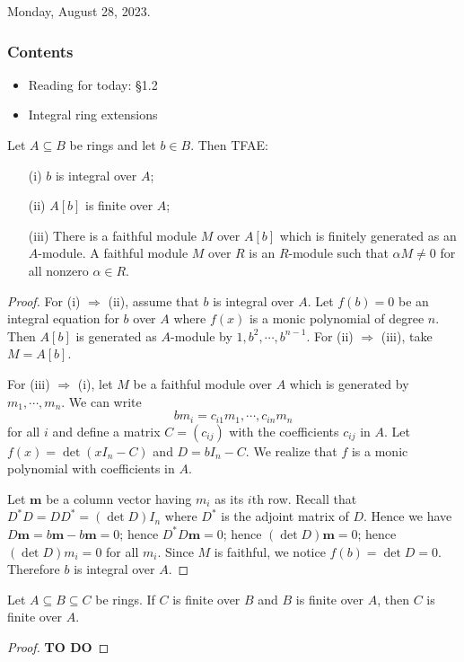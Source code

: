 Monday, August 28, 2023.
\subsubsection*{Contents}
\begin{itemize}
    \item Reading for today: \S 1.2
    \item Integral ring extensions
\end{itemize}

\begin{proposition}
    \label{lecture3_1}
    Let $A\subseteq B$ be rings and let $b \in B$. Then TFAE:
    \begin{enumerate}
        \item[(i)] $b$ is integral over $A$;
        \item[(ii)] $A[b]$ is finite over $A$;
        \item[(iii)] There is a faithful module $M$ over $A[b]$ which is finitely generated as an $A$-module. A faithful module $M$ over $R$ is an $R$-module such that $\alpha M \neq 0$ for all nonzero $\alpha \in R$.
    \end{enumerate}
\end{proposition}
\begin{proof}
    For (i) $\Rightarrow$ (ii), assume that $b$ is integral over $A$. Let $f(b) = 0$ be an integral equation for $b$ over $A$ where $f(x)$ is a monic polynomial of degree $n$. Then $A[b]$ is generated as $A$-module by $1, b^2, \cdots, b^{n-1}$. For (ii) $\Rightarrow$ (iii), take $M = A[b]$.

    For (iii) $\Rightarrow$ (i), let $M$ be a faithful module over $A$ which is generated by $m_1, \cdots, m_n$. We can write 
    \[bm_i = c_{i1}m_1, \cdots, c_{in}m_n\]
    for all $i$ and define a matrix $C = (c_{ij})$ with the coefficients $c_{ij}$ in $A$. Let $f(x) = \det(xI_n - C)$ and $D = bI_n - C$. We realize that $f$ is a monic polynomial with coefficients in $A$.
    
    Let $\mathbf{m}$ be a column vector having $m_i$ as its $i$th row. Recall that $D^*D = DD^* = (\det D) I_n$ where $D^*$ is the adjoint matrix of $D$. Hence we have $D\mathbf{m} = b\mathbf{m} - b\mathbf{m} = 0$; hence $D^*D\mathbf{m} = 0$; hence $(\det D)\mathbf{m} = 0$; hence $(\det D)m_i = 0$ for all $m_i$. Since $M$ is faithful, we notice $f(b) = \det D = 0$. Therefore $b$ is integral over $A$.
\end{proof}

\clearpage
\begin{lemma}
    Let $A \subseteq B \subseteq C$ be rings. If $C$ is finite over $B$ and $B$ is finite over $A$, then $C$ is finite over $A$.
\end{lemma}
\begin{proof}
    \textbf{TO DO}
\end{proof}

